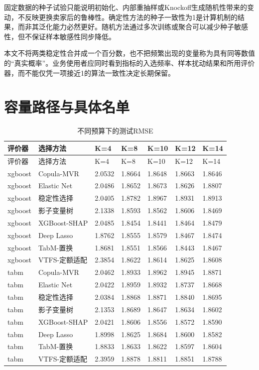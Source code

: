 \documentclass{sufethesismas}
\begin{document}
固定数据的种子试验只能说明初始化、内部重抽样或Knockoff生成随机性带来的变动，不反映更换卖家后的鲁棒性。确定性方法的种子一致性为1是计算机制的结果，而非其泛化能力必然更好。随机方法通过多次训练或聚合可以减少种子敏感性，但不保证样本敏感性同步降低。

本文不将两类稳定性合并成一个百分数，也不把频繁出现的变量称为具有同等数值的``真实概率''。业务使用者应同时看到指标的入选频率、样本扰动结果和所用评价器，而不能仅凭一项接近1的算法一致性决定长期保留。

\section{容量路径与具体名单}

{
\footnotesize
\begin{longtable}[]{@{}lllllll@{}}
\caption{不同预算下的测试RMSE}\tabularnewline
\toprule\noalign{}
评价器 & 选择方法 & K=4 & K=8 & K=10 & K=12 & K=14 \\
\midrule\noalign{}
\endfirsthead
\toprule\noalign{}
评价器 & 选择方法 & K=4 & K=8 & K=10 & K=12 & K=14 \\
\midrule\noalign{}
\endhead
\bottomrule\noalign{}
\endlastfoot
xgboost & Copula-MVR & 2.0532 & 1.8664 & 1.8648 & 1.8663 & 1.8646 \\
xgboost & Elastic Net & 2.0486 & 1.8652 & 1.8673 & 1.8626 & 1.8807 \\
xgboost & 稳定性选择 & 2.0405 & 1.8782 & 1.8967 & 1.8931 & 1.8913 \\
xgboost & 影子变量树 & 2.1338 & 1.8593 & 1.8562 & 1.8606 & 1.8469 \\
xgboost & XGBoost-SHAP & 2.0485 & 1.8454 & 1.8441 & 1.8464 & 1.8479 \\
xgboost & Deep Lasso & 1.8762 & 1.8555 & 1.8579 & 1.8467 & 1.8474 \\
xgboost & TabM-置换 & 1.8681 & 1.8551 & 1.8566 & 1.8443 & 1.8467 \\
xgboost & VTFS-定额适配 & 2.3854 & 1.8622 & 1.8614 & 1.8625 & 1.8608 \\
tabm & Copula-MVR & 2.0462 & 1.8933 & 1.8962 & 1.8945 & 1.8871 \\
tabm & Elastic Net & 2.0422 & 1.8959 & 1.8932 & 1.8737 & 1.8668 \\
tabm & 稳定性选择 & 2.0384 & 1.8868 & 1.8871 & 1.8840 & 1.8695 \\
tabm & 影子变量树 & 2.1353 & 1.8689 & 1.8647 & 1.8634 & 1.8602 \\
tabm & XGBoost-SHAP & 2.0421 & 1.8606 & 1.8556 & 1.8572 & 1.8590 \\
tabm & Deep Lasso & 1.8998 & 1.8625 & 1.8684 & 1.8600 & 1.8582 \\
tabm & TabM-置换 & 1.8833 & 1.8633 & 1.8622 & 1.8597 & 1.8604 \\
tabm & VTFS-定额适配 & 2.3959 & 1.8878 & 1.8811 & 1.8851 & 1.8788 \\
\end{longtable}
}
\end{document}
